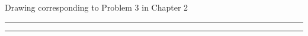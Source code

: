 \documentclass{amsbook}
\begin{document}
\centerline{Drawing corresponding to Problem 3 in Chapter 2}

\medskip

\hrule
\begin{figure}[h]
  
\end{figure}
\hrule
\end{document}
